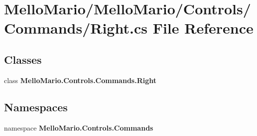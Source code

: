 \section{Mello\+Mario/\+Mello\+Mario/\+Controls/\+Commands/\+Right.cs File Reference}
\label{Right_8cs}
\subsection*{Classes}
\begin{DoxyCompactItemize}
\item 
class \textbf{ Mello\+Mario.\+Controls.\+Commands.\+Right}
\end{DoxyCompactItemize}
\subsection*{Namespaces}
\begin{DoxyCompactItemize}
\item 
namespace \textbf{ Mello\+Mario.\+Controls.\+Commands}
\end{DoxyCompactItemize}
